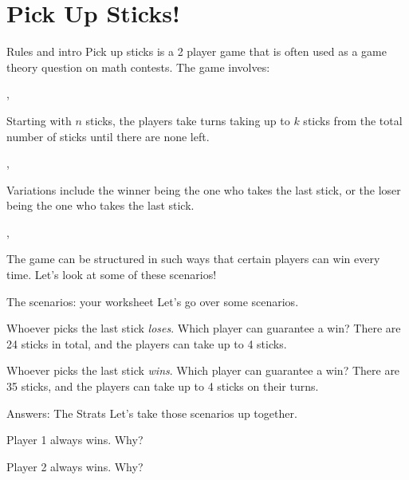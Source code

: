 \section{Pick Up Sticks!}
	\begin{namedframe}{Rules and intro}
		\alert{Pick up sticks} is a 2 player game that is often used as a game theory question on math contests. The game involves:

		\sep

		Starting with $n$ sticks, the players take turns taking up to $k$ sticks from the total number of sticks until there are none left.

		\sep

		Variations include the winner being the one who takes the last stick, or the loser being the one who takes the last stick.

		\sep

		The game can be structured in such ways that certain players can win every time. Let’s look at some of these scenarios!
	\end{namedframe}
	\begin{namedframe}{The scenarios: your worksheet}
		Let's go over some scenarios.
		\begin{description}[<+(1)->]
			\item[Scenario 1] Whoever picks the last stick \emph{loses}. Which player can guarantee a win?
			\vertspace
			There are 24 sticks in total, and the players can take up to 4 sticks.

			\item[Scenario 2] Whoever picks the last stick \emph{wins}. Which player can guarantee a win?
			\vertspace
			There are 35 sticks, and the players can take up to 4 sticks on their turns.
		\end{description}
	\end{namedframe}
	\begin{namedframe}{Answers: The Strats}
		Let's take those scenarios up together.
		\begin{description}[<+(1)->]
			\item[Scenario 1] Player 1 always wins. Why?
			\item[Scenario 2] Player 2 always wins. Why?
		\end{description}
	\end{namedframe}
